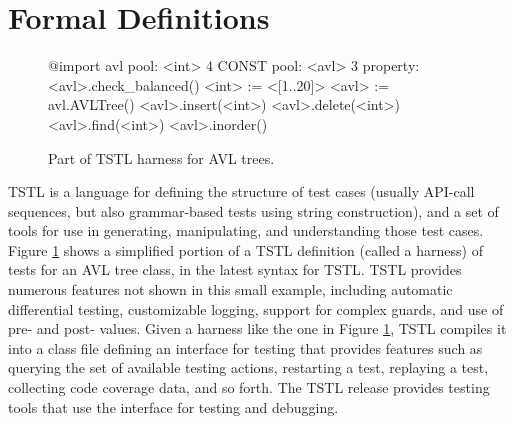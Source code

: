 \section{Formal Definitions}


\begin{figure}[t]
{\scriptsize
\begin{code}
@import avl
\vspace{0.02in}
pool: <int> 4 CONST
pool: <avl> 3
\vspace{0.02in}
property: <avl>.check\_balanced()
\vspace{0.02in}
<int> := <[1..20]>
<avl> := avl.AVLTree()
\vspace{0.02in}
<avl>.insert(<int>)
<avl>.delete(<int>)
<avl>.find(<int>)
<avl>.inorder()
\end{code}
}
\caption{Part of TSTL harness for AVL trees.}
\label{fig:example}
\end{figure}


TSTL \cite{NFM15,ISSTA15} is a language for defining the structure of
test cases (usually API-call sequences, but also grammar-based tests using
string construction), and a set of tools for use in generating,
manipulating, and understanding those test cases.  Figure
\ref{fig:example} shows a simplified portion of a TSTL definition
(called a harness) of
tests for an AVL tree class, in the latest syntax for TSTL.
TSTL provides numerous features not shown in this small example,
including automatic differential testing, customizable logging, support for
complex guards, and use of pre- and post- values.  Given a harness
like the one in Figure \ref{fig:example}, TSTL compiles it into a
class file defining an interface for testing that provides features
such as querying the set of available testing actions, restarting a
test, replaying a test, collecting code coverage data, and so forth.
The TSTL release \cite{tstl} provides testing tools that use the
interface for testing and debugging.

